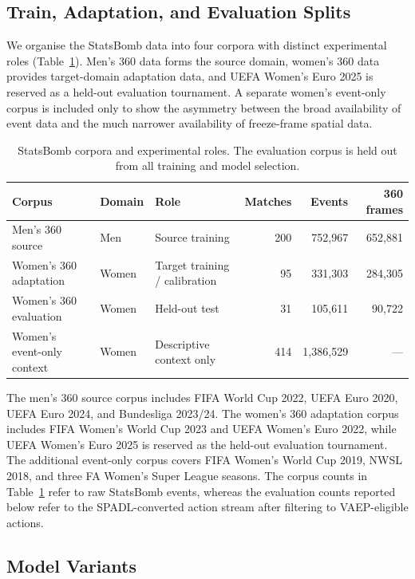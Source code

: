\documentclass[runningheads]{llncs}
\begin{document}
\subsection{Train, Adaptation, and Evaluation Splits}
We organise the StatsBomb data into four corpora with distinct experimental roles (Table~\ref{tab:corpora}). Men's 360 data forms the source domain, women's 360 data provides target-domain adaptation data, and UEFA Women's Euro 2025 is reserved as a held-out evaluation tournament. A separate women's event-only corpus is included only to show the asymmetry between the broad availability of event data and the much narrower availability of freeze-frame spatial data.
\begin{table}[!htbp]
\centering
\scriptsize
\caption{StatsBomb corpora and experimental roles. The evaluation corpus is held out from all training and model selection.}
\label{tab:corpora}
\begin{tabular}{@{}ll l r r r@{}}
\toprule
\textbf{Corpus} & \textbf{Domain} & \textbf{Role} &
\textbf{Matches} & \textbf{Events} & \textbf{360 frames} \\
\midrule
Men's 360 source
& Men
& Source training
& 200
& 752{,}967
& 652{,}881 \\
Women's 360 adaptation
& Women
& Target training / calibration
& 95
& 331{,}303
& 284{,}305 \\
Women's 360 evaluation
& Women
& Held-out test
& 31
& 105{,}611
& 90{,}722 \\
Women's event-only context
& Women
& Descriptive context only
& 414
& 1{,}386{,}529
& --- \\
\bottomrule
\end{tabular}
\end{table}
The men's 360 source corpus includes FIFA World Cup 2022, UEFA Euro 2020, UEFA Euro 2024, and Bundesliga 2023/24. The women's 360 adaptation corpus includes FIFA Women's World Cup 2023 and UEFA Women's Euro 2022, while UEFA Women's Euro 2025 is reserved as the held-out evaluation tournament. The additional event-only corpus covers FIFA Women's World Cup 2019, NWSL 2018, and three FA Women's Super League seasons.
The corpus counts in Table~\ref{tab:corpora} refer to raw StatsBomb events, whereas the evaluation counts reported below refer to the SPADL-converted action stream after filtering to VAEP-eligible actions.
\subsection{Model Variants}
\end{document}
